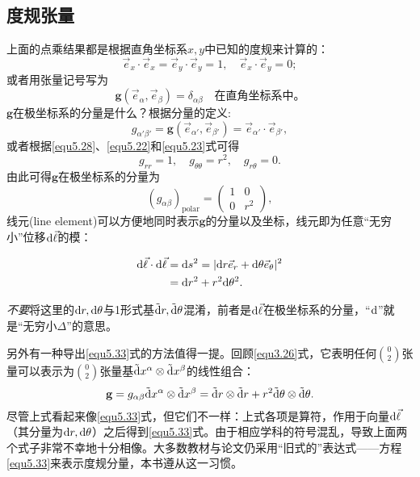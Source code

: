 \subsection*{度规张量}
上面的点乘结果都是根据直角坐标系$x, y$中已知的度规来计算的：
\[
    \vec{e}_x \cdot \vec{e}_x = \vec{e}_y \cdot \vec{e}_y = 1, \quad \vec{e}_x \cdot \vec{e}_y = 0;
\]
或者用张量记号写为
\begin{equation}
    \mathbf{g} (\vec{e}_\alpha, \vec{e}_\beta) = \delta_{\alpha \beta} \quad \text{在直角坐标系中。}
\label{equ5.29}
\end{equation}
$\mathbf{g}$在极坐标系的分量是什么？根据分量的定义:
\begin{equation}
    g_{\alpha' \beta'} = \mathbf{g} (\vec{e}_{\alpha'}, \vec{e}_{\beta'}) = \vec{e}_{\alpha'} \cdot \vec{e}_{\beta'},
\label{equ5.30}
\end{equation}
或者根据\eqref{equ5.28}、\eqref{equ5.22}和\eqref{equ5.23}式可得
\begin{equation}
    g_{rr} = 1, \quad g_{\theta \theta} = r^2, \quad  g_{r \theta} = 0. \label{equ5.31}
\end{equation}
由此可得$\mathbf{g}$在极坐标系的分量为
\begin{equation}
    (g_{\alpha \beta})_{\text{polar}} = 
        \begin{pmatrix}
            1 & 0 \\
            0 & r^2
        \end{pmatrix},
\label{equ5.32}
\end{equation}
线元(line element)可以方便地同时表示$\mathbf{g}$的分量以及坐标，线元即为任意“无穷小”位移$\mathrm{d} \vec{\ell}$的模：
\begin{shaded}
\begin{align}
    \mathrm{d} \vec{\ell} \cdot \mathrm{d} \vec{\ell} &= \mathrm{d} s^2 = |\mathrm{d} r \vec{e}_r + \mathrm{d} \theta \vec{e}_\theta |^2 \notag \\
    &= \mathrm{d} r^2 + r^2 \mathrm{d} \theta^2. \label{equ5.33}
\end{align}
\end{shaded}
\textit{不要}将这里的$\mathrm{d} r, \mathrm{d} \theta$与1形式基$\tilde{\mathrm{d}} r, \tilde{\mathrm{d}} \theta$混淆，前者是$\mathrm{d} \vec{\ell}$在极坐标系的分量，“$\mathrm{d}$”就是“无穷小$\Delta$”的意思。 

另外有一种导出\eqref{equ5.33}式的方法值得一提。回顾\eqref{equ3.26}式，它表明任何$\binom{0}{2}$张量可以表示为$\binom{0}{2}$张量基$\tilde{\mathrm{d}} x^\alpha \otimes \tilde{\mathrm{d}} x^\beta$的线性组合：
\[
    \mathbf{g} = g_{\alpha \beta} \tilde{\mathrm{d}} x^\alpha \otimes \tilde{\mathrm{d}} x^\beta = \tilde{\mathrm{d}} r \otimes \tilde{\mathrm{d}} r + r^2 \tilde{\mathrm{d}} \theta \otimes \tilde{\mathrm{d}} \theta.
\]
尽管上式看起来像\eqref{equ5.33}式，但它们不一样：上式各项是算符，作用于向量$\mathrm{d} \vec{\ell}$（其分量为$\mathrm{d} r, \mathrm{d} \theta$）之后得到\eqref{equ5.33}式。由于相应学科的符号混乱，导致上面两个式子非常不幸地十分相像。大多数教材与论文仍采用“旧式的”表达式——方程\eqref{equ5.33}来表示度规分量，本书遵从这一习惯。

